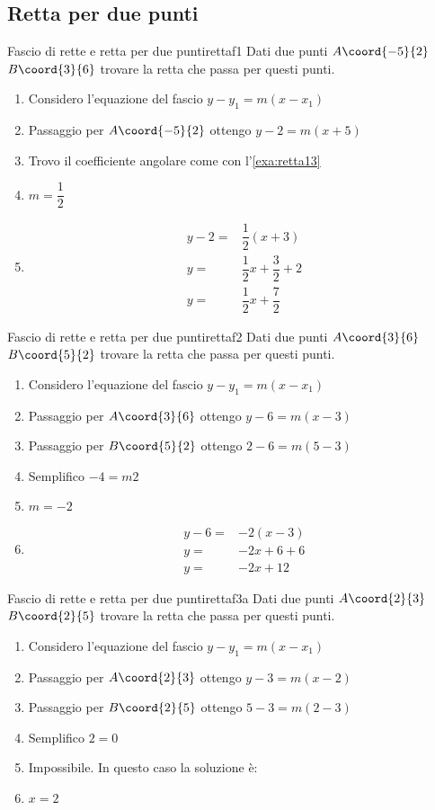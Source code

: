 \subsection{Retta per due punti}
\begin{esempiot}{Fascio di rette e retta per due punti}{rettaf1}
Dati due punti $A\coord{-5}{2}$ $B\coord{3}{6}$ trovare la retta che passa per questi punti.
\end{esempiot}
\begin{enumerate}
	\item Considero l'equazione del fascio $y-y_1=m(x-x_1)$
	\item Passaggio per $A\coord{-5}{2}$ ottengo $y-2=m(x+5)$
	\item Trovo il coefficiente angolare come con l'\cref{exa:retta13}
	\item $m=\dfrac{1}{2}$
	\item \begin{align*}
		y-2=&\dfrac{1}{2}(x+3)\\
		y=&\dfrac{1}{2}x+\dfrac{3}{2}+2\\
		y=&\dfrac{1}{2}x+\dfrac{7}{2}
	\end{align*}
\end{enumerate}
\begin{esempiot}{Fascio di rette e retta per due punti}{rettaf2}
	Dati due punti $A\coord{3}{6}$ $B\coord{5}{2}$ trovare la retta che passa per questi punti.
\end{esempiot}
\begin{enumerate}
	\item Considero l'equazione del fascio $y-y_1=m(x-x_1)$
	\item Passaggio per $A\coord{3}{6}$ ottengo $y-6=m(x-3)$
	\item Passaggio per $B\coord{5}{2}$ ottengo $2-6=m(5-3)$
	\item Semplifico $-4=m2$
	\item $m=-2$
	\item \begin{align*}
		y-6=&-2(x-3)\\
		y=&-2x+6+6\\
		y=&-2x+12
	\end{align*}
\end{enumerate}
\begin{cesempiot}{Fascio di rette e retta per due punti}{rettaf3a}
	Dati due punti $A\coord{2}{3}$ $B\coord{2}{5}$ trovare la retta che passa per questi punti.
\end{cesempiot}
\begin{enumerate}
	\item Considero l'equazione del fascio $y-y_1=m(x-x_1)$
	\item Passaggio per $A\coord{2}{3}$ ottengo $y-3=m(x-2)$
	\item Passaggio per $B\coord{2}{5}$ ottengo $5-3=m(2-3)$
	\item Semplifico $2=0$
	\item Impossibile. In questo caso la soluzione è:
	\item $x=2$
\end{enumerate}
